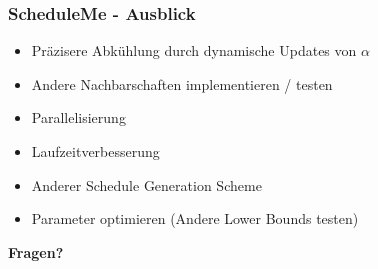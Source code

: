 \documentclass[aspectratio=169]{beamer}
\begin{document}

\begin{frame}[t]
\frametitle{ScheduleMe - Ausblick}

\begin{itemize}
	\item Präzisere Abkühlung durch dynamische Updates von $\alpha$
	\item Andere Nachbarschaften implementieren / testen
	\item Parallelisierung
	\item Laufzeitverbesserung
	\item Anderer Schedule Generation Scheme
	\item Parameter optimieren (Andere Lower Bounds testen)
	\pause
\end{itemize}
\centering
\vspace{40pt}
\textbf{\Large{Fragen?}}
\end{frame}
\end{document}
